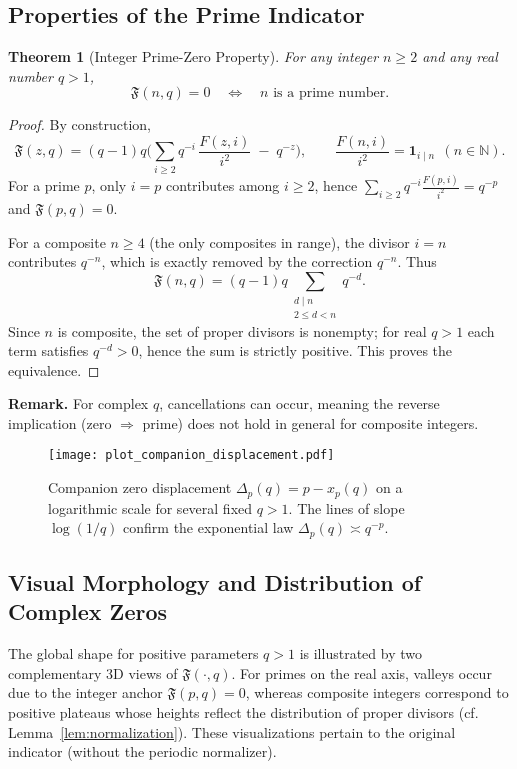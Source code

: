\documentclass[11pt,a4paper]{amsart}
\theoremstyle{plain}
\newtheorem{theorem}{Theorem}[section]
\theoremstyle{definition}
\theoremstyle{remark}
\begin{document}
\subsection{Properties of the Prime Indicator}

\begin{theorem}[Integer Prime-Zero Property]\label{thm:integer-prime-zero}
For any integer $n \ge 2$ and any real number $q>1$,
\[\mathfrak{F}(n,q) = 0 \quad\Longleftrightarrow\quad n \text{ is a prime number}.\]
\end{theorem}
\begin{proof}
By construction,
\[
\mathfrak{F}(z,q)=(q-1)q\Big(\sum_{i\ge2} q^{-i}\,\frac{F(z,i)}{i^2}\;-\;q^{-z}\Big),\qquad
\frac{F(n,i)}{i^2}=\mathbf 1_{i\mid n}\ \ (n\in\mathbb N).
\]
For a prime $p$, only $i=p$ contributes among $i\ge2$, hence $\sum_{i\ge2} q^{-i}\tfrac{F(p,i)}{i^2}=q^{-p}$ and $\mathfrak F(p,q)=0$.

For a composite $n\ge4$ (the only composites in range), the divisor $i=n$ contributes $q^{-n}$, which is exactly removed by the correction $q^{-n}$. Thus
\[
\mathfrak F(n,q)=(q-1)q\!\!\sum_{\substack{d\mid n\\2\le d<n}}\! q^{-d}.
\]
Since $n$ is composite, the set of proper divisors is nonempty; for real $q>1$ each term satisfies $q^{-d}>0$, hence the sum is strictly positive. This proves the equivalence.
\end{proof}

\noindent\textbf{Remark.} For complex $q$, cancellations can occur, meaning the reverse implication (zero $\Rightarrow$ prime) does not hold in general for composite integers.


\begin{figure}[t]
\centering
\texttt{[image: plot\_companion\_displacement.pdf]}
\caption{Companion zero displacement $\Delta_p(q)=p-x_p(q)$ on a logarithmic scale for several fixed $q>1$. The lines of slope $\log(1/q)$ confirm the exponential law $\Delta_p(q)\asymp q^{-p}$.}
\label{fig:companion_displacement}
\end{figure}

\FloatBarrier


\subsection{Visual Morphology and Distribution of Complex Zeros}\label{sec:qpos-morph-3d}
The global shape for positive parameters $q>1$ is illustrated by two complementary 3D views of $\mathfrak{F}(\cdot,q)$. For primes on the real axis, valleys occur due to the integer anchor $\mathfrak F(p,q)=0$, whereas composite integers correspond to positive plateaus whose heights reflect the distribution of proper divisors (cf. Lemma~\ref{lem:normalization}). These visualizations pertain to the original indicator (without the periodic normalizer).
\end{document}
